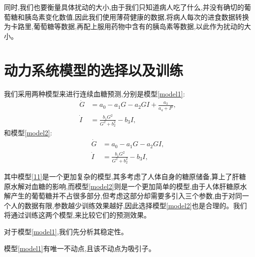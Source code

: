 同时,我们也要衡量具体扰动的大小,由于我们只知道病人吃了什么,并没有确切的葡萄糖和胰岛素变化数值,因此我们使用薄荷健康的数据,将病人每次的进食数据转换为卡路里,葡萄糖等数据,再配上服用药物中含有的胰岛素等数据,以此作为扰动的大小。
\section{动力系统模型的选择以及训练}
我们采用两种模型来进行连续血糖预测,分别是模型\ref{model1}:
\begin{equation}\label{model1}
    \begin{aligned}
        \dot{G} & = a_0-a_1G-a_2GI+\frac{a_3}{a_4+I^p},  \\
        \dot{I} & = \frac{b_1 G^2}{G^2 + b_2^2} - b_3 I,
    \end{aligned}
\end{equation}
和模型\ref{model2}:
\begin{equation}\label{model2}
    \begin{aligned}
        \dot{G} & = a_0-a_1G-a_2GI,  \\
        \dot{I} & = \frac{b_1 G^2}{G^2 + b_2^2} - b_3 I,
    \end{aligned}
\end{equation}

其中模型\ref{11}是一个更加复杂的模型,其多考虑了人体自身的糖原储备,算上了肝糖原水解对血糖的影响,而模型\ref{model2}则是一个更加简单的模型,由于人体肝糖原水解产生的葡萄糖并不占很多部分,但考虑这部分却需要多引入三个参数,由于对同一个人的数据有限,参数越少训练效果越好,因此选择模型\ref{model2}也是合理的。我们将通过训练这两个模型,来比较它们的预测效果。

对于模型\ref{model1},我们先分析其稳定性。
\begin{prop}
    模型\ref{model1}有唯一不动点,且该不动点为吸引子。
\end{prop}


